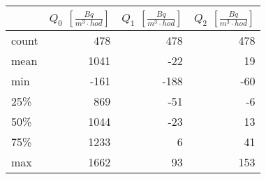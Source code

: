 \begin{tabular}{lrrr}
\toprule
{} &  $Q_0$ $\left[\si{\frac{Bq}{m^3\cdot hod}}\right]$ &  $Q_1$ $\left[\si{\frac{Bq}{m^3\cdot hod}}\right]$ &  $Q_2$ $\left[\si{\frac{Bq}{m^3\cdot hod}}\right]$ \\
\midrule
count &                                                478 &                                                478 &                                                478 \\
mean  &                                               1041 &                                                -22 &                                                 19 \\
min   &                                               -161 &                                               -188 &                                                -60 \\
25\%   &                                                869 &                                                -51 &                                                 -6 \\
50\%   &                                               1044 &                                                -23 &                                                 13 \\
75\%   &                                               1233 &                                                  6 &                                                 41 \\
max   &                                               1662 &                                                 93 &                                                153 \\
\bottomrule
\end{tabular}
